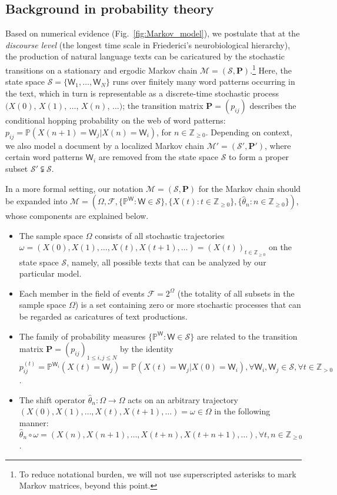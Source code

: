 \documentclass[10pt,journal,compsoc]{IEEEtran}
\begin{document}
\subsection{Background in probability theory}
Based on numerical evidence (Fig.~\ref{fig:Markov_model}),  we postulate that at the \textit{discourse level} (the  longest time scale in Friederici's   \cite{Friederici1999} neurobiological hierarchy), the production of natural  language texts   can be caricatured by the stochastic transitions on a stationary and ergodic Markov chain $ \mathscr M=(\mathscr S,\mathbf P)$.\footnote{To reduce notational burden, we will not use superscripted asterisks to mark  Markov  matrices,  beyond this point.
}
Here, the state space $ \mathscr S=\{\mathsf W_1,\dots,\mathsf W_N\}$ runs over finitely many word patterns occurring in the text, which in turn is representable as a discrete-time stochastic process $ (X(0)$, $X(1)$, $\dots$, $X(n)$, $\dots)$;  the transition matrix $ \mathbf P=(p_{ij})$ describes the conditional hopping  probability on the web of
word patterns: $ p_{ij}=\mathbb P(X(n+1)=\mathsf W_j|X(n)=\mathsf W_i)$, for $ n\in\mathbb Z_{\geq0}$. Depending on context, we also model a document by a localized  Markov chain  $ \mathscr M'=(\mathscr S',\mathbf P')$, where certain word patterns $ \mathsf W_i$ are removed from the state space $ \mathscr S$ to form a proper subset $ \mathscr S'\subsetneqq\mathscr S$.

In a more formal setting, our notation  $ \mathscr  M=(\mathscr S,\mathbf P) $ for the Markov chain should be expanded into $ \mathscr M=(\varOmega,\mathscr F, \{\mathbb P^{\mathsf W}:\mathsf W\in\mathscr S\},\{X(t):t\in\mathbb Z_{\geq0}\}, \{\widehat{\theta}_n:n\in\mathbb  Z_{\geq0}\})$, whose components  are explained below.\begin{itemize}[]
\item
The sample space $ \varOmega$ consists of all stochastic trajectories $ \omega=(X(0),X(1),\dots,X(t),X(t+1),\dots)=(X(t))_{t\in\mathbb Z_{\geq0}}$ on the state space $ \mathscr S$, namely,    all possible texts that can be analyzed by our particular model.\item Each member  in the field of events  $ \mathscr F=2^{\varOmega}$ (the totality of all subsets in the sample space  $ \varOmega$) is a set containing zero or more stochastic processes that can be regarded as  caricatures of  text productions. \item The family of probability measures $\{\mathbb P^{\mathsf W}:\mathsf W\in\mathscr S\} $ are related to the transition matrix $ \mathbf P=(p_{ij})_{1\leq i, j\leq N}$ by the identity $ p_{ij}^{(t)}=\mathbb P^{\mathsf W_i}(X(t)=\mathsf W_j)=\mathbb P(X(t)=\mathsf W_j|X(0)=\mathsf W_i),\forall \mathsf W_i,\mathsf W_j\in\mathscr S,\forall t\in\mathbb Z_{>0}$. \item The shift operator $ \widehat{\theta}_n:\varOmega\longrightarrow\varOmega$ acts on an arbitrary trajectory $ (X(0),X(1),\dots,X(t),X(t+1),\dots)=\omega\in\varOmega$ in the following manner: $ \widehat{\theta}_n\circ\omega=(X(n),X(n+1),\dots,X(t+n),X(t+n+1),\dots),\forall t,n\in\mathbb Z_{\geq0}$.
\end{itemize}
\end{document}
